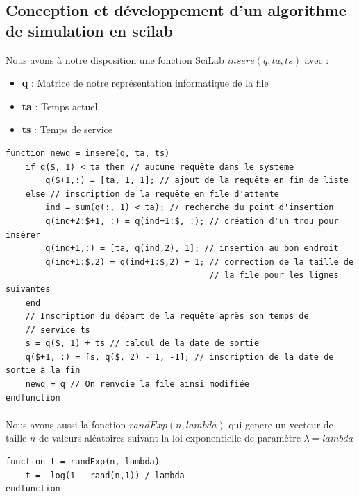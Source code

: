 \documentclass{article}
\begin{document}
\subsection{Conception et développement d'un algorithme de simulation en scilab}
Nous avons à notre disposition une fonction SciLab $insere(q, ta, ts)$ avec :
\begin{itemize}
	\item \textbf{q} : Matrice de notre représentation informatique de la file
	\item \textbf{ta} : Temps actuel
	\item \textbf{ts} : Temps de service
\end{itemize}
\begin{verbatim}
function newq = insere(q, ta, ts)
    if q($, 1) < ta then // aucune requête dans le système
        q($+1,:) = [ta, 1, 1]; // ajout de la requête en fin de liste
    else // inscription de la requête en file d'attente
        ind = sum(q(:, 1) < ta); // recherche du point d'insertion
        q(ind+2:$+1, :) = q(ind+1:$, :); // création d'un trou pour insérer
        q(ind+1,:) = [ta, q(ind,2), 1]; // insertion au bon endroit
        q(ind+1:$,2) = q(ind+1:$,2) + 1; // correction de la taille de
                                         // la file pour les lignes suivantes
    end
    // Inscription du départ de la requête après son temps de
    // service ts
    s = q($, 1) + ts // calcul de la date de sortie
    q($+1, :) = [s, q($, 2) - 1, -1]; // inscription de la date de sortie à la fin
    newq = q // On renvoie la file ainsi modifiée
endfunction
\end{verbatim}
\paragraph{}
Nous avons aussi la fonction $randExp(n,lambda)$ qui genere un vecteur de taille $n$ de valeurs aléatoires suivant la loi exponentielle de paramètre $\lambda=lambda$
\begin{verbatim}
function t = randExp(n, lambda)
    t = -log(1 - rand(n,1)) / lambda
endfunction
\end{verbatim}
\end{document}
